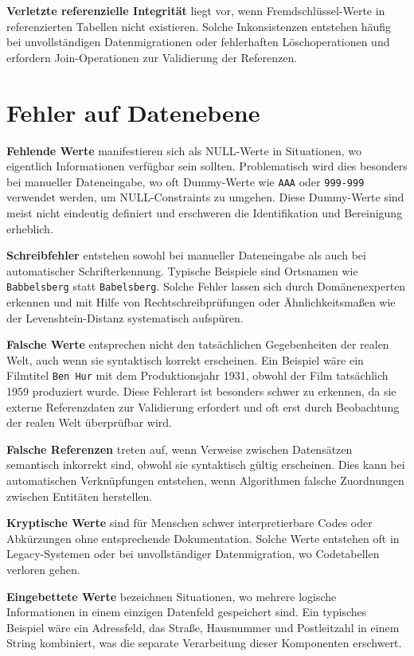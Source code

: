 \documentclass[
    a4paper,
    12pt,
    headinclude=true,
    BCOR=10mm,
]{scrreprt}
\begin{document}
\textbf{Verletzte referenzielle Integrität} liegt vor, wenn Fremdschlüssel-Werte in referenzierten Tabellen nicht existieren. Solche Inkonsistenzen entstehen häufig bei unvollständigen Datenmigrationen oder fehlerhaften Löschoperationen und erfordern Join-Operationen zur Validierung der Referenzen.

\section{Fehler auf Datenebene}

\textbf{Fehlende Werte} manifestieren sich als NULL-Werte in Situationen, wo eigentlich Informationen verfügbar sein sollten. Problematisch wird dies besonders bei manueller Dateneingabe, wo oft Dummy-Werte wie \texttt{AAA} oder \texttt{999-999} verwendet werden, um NULL-Constraints zu umgehen. Diese Dummy-Werte sind meist nicht eindeutig definiert und erschweren die Identifikation und Bereinigung erheblich.

\textbf{Schreibfehler} entstehen sowohl bei manueller Dateneingabe als auch bei automatischer Schrifterkennung. Typische Beispiele sind Ortsnamen wie \texttt{Babbelsberg} statt \texttt{Babelsberg}. Solche Fehler lassen sich durch Domänenexperten erkennen und mit Hilfe von Rechtschreibprüfungen oder Ähnlichkeitsmaßen wie der Levenshtein-Distanz systematisch aufspüren.

\textbf{Falsche Werte} entsprechen nicht den tatsächlichen Gegebenheiten der realen Welt, auch wenn sie syntaktisch korrekt erscheinen. Ein Beispiel wäre ein Filmtitel \texttt{Ben Hur} mit dem Produktionsjahr 1931, obwohl der Film tatsächlich 1959 produziert wurde. Diese Fehlerart ist besonders schwer zu erkennen, da sie externe Referenzdaten zur Validierung erfordert und oft erst durch Beobachtung der realen Welt überprüfbar wird.

\textbf{Falsche Referenzen} treten auf, wenn Verweise zwischen Datensätzen semantisch inkorrekt sind, obwohl sie syntaktisch gültig erscheinen. Dies kann bei automatischen Verknüpfungen entstehen, wenn Algorithmen falsche Zuordnungen zwischen Entitäten herstellen.

\textbf{Kryptische Werte} sind für Menschen schwer interpretierbare Codes oder Abkürzungen ohne entsprechende Dokumentation. Solche Werte entstehen oft in Legacy-Systemen oder bei unvollständiger Datenmigration, wo Codetabellen verloren gehen.

\textbf{Eingebettete Werte} bezeichnen Situationen, wo mehrere logische Informationen in einem einzigen Datenfeld gespeichert sind. Ein typisches Beispiel wäre ein Adressfeld, das Straße, Hausnummer und Postleitzahl in einem String kombiniert, was die separate Verarbeitung dieser Komponenten erschwert.
\end{document}
